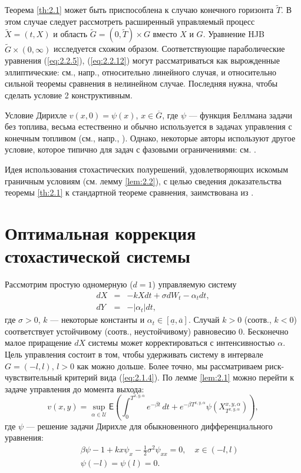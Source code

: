 \begin{remark}
Теорема \ref{th:2.1} может быть приспособлена к случаю конечного горизонта $\widetilde T$. В этом случае следует рассмотреть расширенный управляемый процесс $\widetilde X=(t,X)$ и область $\widetilde G=(0,\widetilde T)\times G$ вместо $X$ и $G$. Уравнение HJB $\widetilde G\times (0,\infty)$ исследуется схожим образом. Соответствующие параболические уравнения (\ref{eq:2.2.5}), (\ref{eq:2.2.12}) могут рассматриваться как вырожденные эллиптические: см., напр., \cite{Kry96} относительно линейного случая, и \cite[Corollary 3.1]{Cha04} относительно сильной теоремы сравнения в нелинейном случае. Последняя нужна, чтобы сделать условие 2 конструктивным.
\end{remark}

\begin{remark} Условие Дирихле $v(x,0)=\psi(x)$, $x\in \overline G$, где $\psi$ --- функция Беллмана задачи без топлива, весьма естественно и обычно используется в задачах управления с конечным топливом (см., напр., \cite[VIII.6]{FleSon06}). Однако, некоторые авторы используют другое условие, которое типично для задач с фазовыми ограничениями: см. \cite{PemZhaYin07,MotSar07}.
\end{remark}

\begin{remark} Идея использования стохастических полурешений, удовлетворяющих искомым граничным условиям (см. лемму \ref{lem:2.2}), с целью сведения доказательства теоремы \ref{th:2.1} к стандартной теореме сравнения, заимствована из \cite{BayZha15}.
\end{remark}

\section{Оптимальная коррекция стохастической системы} \label{sec:2.3}
Рассмотрим простую одномерную ($d=1$) управляемую систему
\begin{eqnarray*}
dX &=& -kXdt+\sigma dW_t-\alpha_t dt, \\
dY &=& -|\alpha_t|dt,
\end{eqnarray*}
где $\sigma>0$, $k$ --- некоторые константы и $\alpha_t\in [\underline a,\overline a]$. Случай $k>0$ (соотв., $k<0$) соответствует устойчивому (соотв., неустойчивому) равновесию $0$. Бесконечно малое приращение $dX$ системы может корректироваться с интенсивностью $\alpha$. Цель управления состоит в том, чтобы удерживать систему в интервале $G=(-l,l)$, $l>0$ как можно дольше. Более точно, мы рассматриваем риск-чувствительный критерий вида (\ref{eq:2.1.4}). По лемме \ref{lem:2.1} можно перейти к задаче управления до момента выхода:
$$ v(x,y)=\sup_{\alpha\in\mathcal U}\mathsf E\left(\int_0^{T^{x,y,\alpha}} e^{-\beta t}\,dt+e^{-\beta T^{x,y,\alpha}}\psi(X_{T^{x,y,\alpha}}^{x,y,\alpha})\right),$$
где $\psi$ --- решение задачи Дирихле для обыкновенного дифференциального уравнения:
\begin{eqnarray*}
&&\beta \psi -1 +kx\psi_x-\frac{1}{2}\sigma^2 \psi_{xx}=0, \quad x \in (-l,l)\\
&& \psi(-l)=\psi(l)=0.
\end{eqnarray*}


